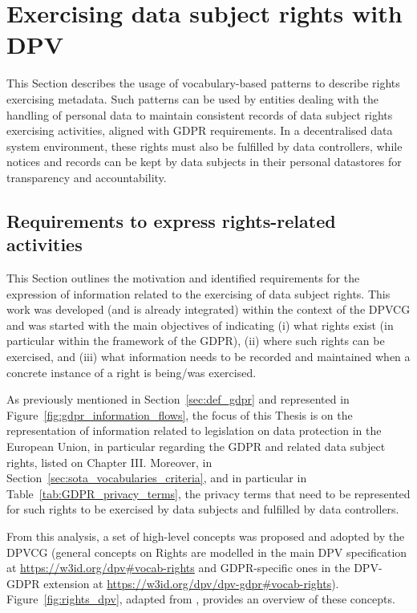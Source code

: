\section{Exercising data subject rights with DPV}
\label{sec:rights_exercising}

This Section describes the usage of vocabulary-based patterns to describe rights exercising metadata.
Such patterns can be used by entities dealing with the handling of personal data to maintain consistent records of data subject rights exercising activities, aligned with GDPR requirements.
In a decentralised data system environment, these rights must also be fulfilled by data controllers,  while notices and records can be kept by data subjects in their personal datastores for transparency and accountability.

\subsection{Requirements to express rights-related activities}
\label{sec:rights_concepts}

This Section outlines the motivation and identified requirements for the expression of information related to the exercising of data subject rights.
This work was developed (and is already integrated) within the context of the DPVCG and was started with the main objectives of indicating (i) what rights exist (in particular within the framework of the GDPR), (ii) where such rights can be exercised, and (iii) what information needs to be recorded and maintained when a concrete instance of a right is being/was exercised.

As previously mentioned in Section~\ref{sec:def_gdpr} and represented in Figure~\ref{fig:gdpr_information_flows}, the focus of this Thesis is on the representation of information related to legislation on data protection in the European Union, in particular regarding the GDPR and related data subject rights, listed on Chapter III.
Moreover, in Section~\ref{sec:sota_vocabularies_criteria}, and in particular in Table~\ref{tab:GDPR_privacy_terms}, the privacy terms that need to be represented for such rights to be exercised by data subjects and fulfilled by data controllers.

From this analysis, a set of high-level concepts was proposed and adopted by the DPVCG (general concepts on Rights are modelled in the main DPV specification at \url{https://w3id.org/dpv#vocab-rights} and GDPR-specific ones in the DPV-GDPR extension at \url{https://w3id.org/dpv/dpv-gdpr#vocab-rights}).
Figure~\ref{fig:rights_dpv}, adapted from \cite{pandit_primer_2022}, provides an overview of these concepts.

